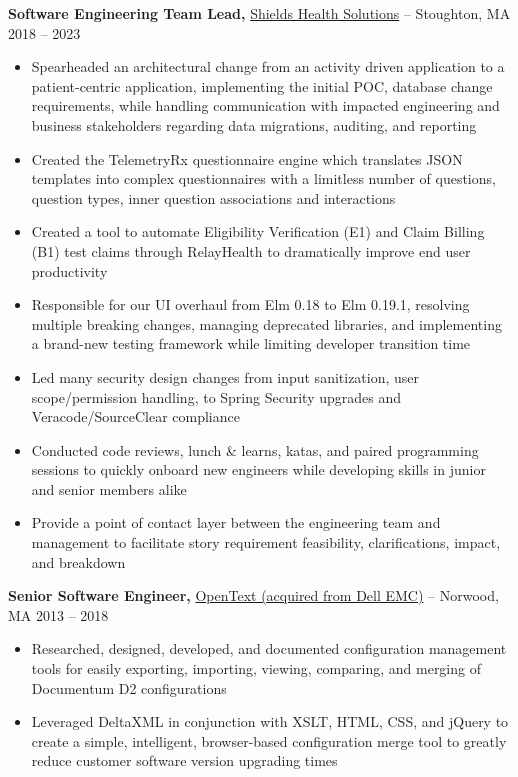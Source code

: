 \documentclass[10pt,letterpaper]{article}
\begin{document}
\textbf{Software Engineering Team Lead,} \href{https://www.fstl1992.com/}{Shields Health Solutions} -- Stoughton, MA \hfill 2018 -- 2023 \\
\vspace{-9pt}
\begin{itemize}
   \item Spearheaded an architectural change from an activity driven application to a patient-centric application, implementing the initial POC, database change requirements, while handling communication with impacted engineering and business stakeholders regarding data migrations, auditing, and reporting
  \item Created the TelemetryRx questionnaire engine which translates JSON templates into complex questionnaires with a limitless number of questions, question types, inner question associations and interactions
  \item Created a tool to automate Eligibility Verification (E1) and Claim Billing (B1) test claims through RelayHealth to dramatically improve end user productivity
  \item Responsible for our UI overhaul from Elm 0.18 to Elm 0.19.1, resolving multiple breaking changes, managing deprecated libraries, and implementing a brand-new testing framework while limiting developer transition time
  \item Led many security design changes from input sanitization, user scope/permission handling, to Spring Security upgrades and Veracode/SourceClear compliance
  \item Conducted code reviews, lunch \& learns, katas, and paired programming sessions to quickly onboard new engineers while developing skills in junior and senior members alike
  \item Provide a point of contact layer between the engineering team and management to facilitate story requirement feasibility, clarifications, impact, and breakdown 
\end{itemize}

\textbf{Senior Software Engineer,} \href{https://www.fstl1992.com/}{OpenText (acquired from Dell EMC)} -- Norwood, MA \hfill 2013 -- 2018 \\
\vspace{-9pt}
\begin{itemize}
  \item Researched, designed, developed, and documented configuration management tools for easily exporting, importing, viewing, comparing, and merging of Documentum D2 configurations
  \item Leveraged DeltaXML in conjunction with XSLT, HTML, CSS, and jQuery to create a simple, intelligent, browser-based configuration merge tool to greatly reduce customer software version upgrading times
\end{itemize}
\end{document}
